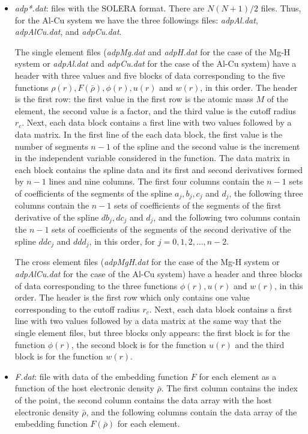 \documentclass{article}
\begin{document}
\begin{itemize}
	\item \textit{adp*.dat}: files with the SOLERA format. There are $N(N+1)/2$ files. Thus, for the Al-Cu system we have the three followings files: \textit{adpAl.dat}, \textit{adpAlCu.dat}, and \textit{adpCu.dat}. 
	
	The single element files (\textit{adpMg.dat} and \textit{adpH.dat} for the case of the Mg-H system or \textit{adpAl.dat} and \textit{adpCu.dat} for the case of the Al-Cu system) have a header with three values and five blocks of data corresponding to the five functions $\rho(r),F(\bar{\rho}),\phi(r),u(r)$ and $w(r)$, in this order. The header is the first row: the first value in the first row is the atomic mass $M$ of the element, the second value is a factor, and the third value is the cutoff radius $r_c$. Next, each data block contains a first line with two values followed by a data matrix. In the first line of the each data block, the first value is the number of segments $n-1$ of the spline and the second value is the increment in the independent variable considered in the function. The data matrix in each block contains the spline data and its first and second derivatives formed by $n-1$ lines and nine columns. The first four columns contain the $n-1$ sets of coefficients of the segments of the spline $a_j,b_j,c_j$ and $d_j$, the following three columns contain the $n-1$ sets of coefficients of the segments of the first derivative of the spline $db_j,dc_j$ and $d_j$, and the following two columns contain the $n-1$ sets of coefficients of the segments of the second derivative of the spline $ddc_j$ and $ddd_j$, in this order, for $j=0,1,2,...,n-2$.
	
	The cross element files (\textit{adpMgH.dat} for the case of the Mg-H system or \textit{adpAlCu.dat} for the case of the Al-Cu system) have a header and three blocks of data corresponding to the three functions $\phi(r),u(r)$ and $w(r)$, in this order. The header is the first row which only contains one value corresponding to the cutoff radius $r_c$. Next, each data block contains a first line with two values followed by a data matrix at the same way that the single element files, but three blocks only appears: the first block is for the function $\phi(r)$, the second block is for the function $u(r)$ and the third block is for the function $w(r)$.
	
	\item \textit{F.dat}: file with data of the embedding function $F$ for each element as a function of the host electronic density $\bar{\rho}$. The first column contains the index of the point, the second column contains the data array with the host electronic density $\bar{\rho}$, and the following columns contain the data array of the embedding function $F(\bar{\rho})$ for each element.  
	

\end{itemize}
\end{document}
